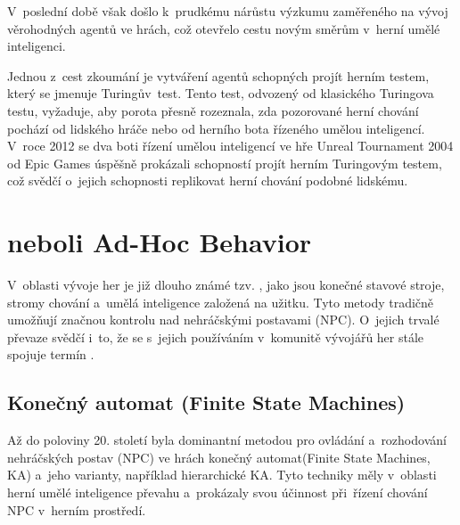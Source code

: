 \newpage

V~poslední době však došlo k~prudkému nárůstu výzkumu zaměřeného na vývoj věrohodných agentů ve hrách, což otevřelo cestu novým směrům v~herní umělé inteligenci. 

Jednou z~cest zkoumání je vytváření agentů schopných projít herním testem, který se jmenuje Turingův~test\cite{OGDD2021}. Tento test, odvozený od klasického Turingova testu, vyžaduje, aby porota přesně rozeznala, zda pozorované herní chování pochází od lidského hráče nebo od herního bota řízeného umělou inteligencí. V~roce 2012 se dva boti řízení umělou inteligencí ve hře Unreal Tournament 2004 od Epic Games úspěšně prokázali schopností projít herním Turingovým testem, což svědčí o~jejich schopnosti replikovat herní chování podobné lidskému.

\newpage

\section{ neboli Ad-Hoc Behavior}
V~oblasti vývoje her je již dlouho známé tzv. , jako jsou konečné stavové stroje, stromy chování a~umělá inteligence založená na užitku. Tyto metody tradičně umožňují značnou kontrolu nad nehráčskými postavami (NPC). O~jejich trvalé převaze svědčí i~to, že se s~jejich používáním v~komunitě vývojářů her stále spojuje termín .

\subsection{Konečný automat (Finite State Machines)}
Až do poloviny 20. století byla dominantní metodou pro ovládání a~rozhodování nehráčských postav (NPC) ve hrách konečný automat(Finite State Machines, KA)\cite{Gill207} a~jeho varianty, například hierarchické KA. Tyto techniky měly v~oblasti herní umělé inteligence převahu a~prokázaly svou účinnost při~řízení chování NPC v~herním prostředí.

